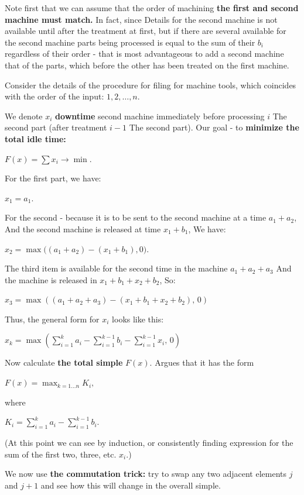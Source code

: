 Note first that we can assume that the order of machining \textbf{the first and second machine must match.} In fact, since Details for the second machine is not available until after the treatment at first, but if there are several available for the second machine parts being processed is equal to the sum of their $b_i$ regardless of their order - that is most advantageous to add a second machine that of the parts, which before the other has been treated on the first machine.

Consider the details of the procedure for filing for machine tools, which coincides with the order of the input: $1, 2, \ldots, n$.

We denote $x_i$ \textbf{downtime} second machine immediately before processing $i$ The second part (after treatment $i-1$ The second part). Our goal - to \textbf{minimize the total idle time:}

$F (x) = \sum x_i \longrightarrow \min.$

For the first part, we have:

$x_1 = a_1.$

For the second - because it is to be sent to the second machine at a time $a_1 + a_2$, And the second machine is released at time $x_1 + b_1$, We have:

$x_2 = \max \Big ((a_1 + a_2) - (x_1 + b_1), 0 \Big).$

The third item is available for the second time in the machine $a_1 + a_2 + a_3$ And the machine is released in $x_1 + b_1 + x_2 + b_2$, So:

$x_{3}=\max\left((a_{1}+a_{2}+a_{3})-(x_{1}+b_{1}+x_{2}+b_{2}),\,0\right)$

Thus, the general form for $x_i$ looks like this:

$x_{k}=\max\left(\sum_{i=1}^{k}a_{i}-\sum_{i=1}^{k-1}b_{i}-\sum_{i=1}^{k-1}x_{i},\,0\right)$

Now calculate \textbf{the total simple} $F (x)$. Argues that it has the form

$F (x) = \max_ {k = 1 \ldots n} K_i,$

where

$K_i = \sum_ {i = 1} ^ {k} a_i - \sum_ {i = 1} ^ {k-1} b_i.$

(At this point we can see by induction, or consistently finding expression for the sum of the first two, three, etc. $x_i$.)

We now use \textbf{the commutation trick:} try to swap any two adjacent elements $j$ and $j +1$ and see how this will change in the overall simple.

